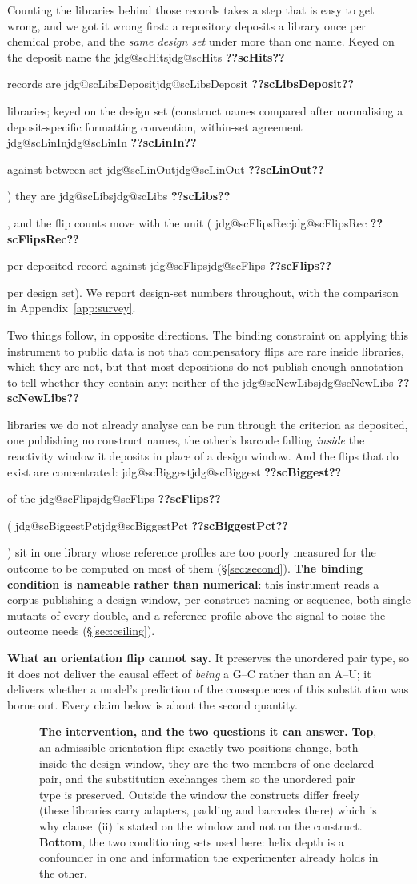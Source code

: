 \documentclass[11pt]{article}
\makeatletter
\newcommand{\jdg}[1]{%
  \ifcsname jdg@#1\endcsname\csname jdg@#1\endcsname
  \else\textbf{??#1??}\PackageError{nm}{undefined measured quantity #1}{}\fi}
\makeatother
\begin{document}
Counting the libraries behind those records takes a step that is easy to get wrong, and we got it
wrong first: a repository deposits a library once per chemical probe, and the \emph{same design
set} under more than one name. Keyed on the deposit name the \jdg{scHits} records
are \jdg{scLibsDeposit} libraries; keyed on the design set (construct names compared after
normalising a deposit-specific formatting convention, within-set agreement \jdg{scLinIn} against
between-set \jdg{scLinOut}) they are \jdg{scLibs}, and the flip counts move with the unit (\jdg{scFlipsRec} per deposited record against \jdg{scFlips} per design
set). We report design-set numbers throughout, with the comparison in Appendix~\ref{app:survey}.

Two things follow, in opposite directions. The binding constraint on applying this instrument to
public data is not that compensatory flips are rare inside libraries, which they are not, but that
most depositions do not publish enough annotation to tell whether they contain any: neither of the
\jdg{scNewLibs} libraries we do not already analyse can be run through the criterion as deposited,
one publishing no construct names, the other's barcode falling \emph{inside} the reactivity window
it deposits in place of a design window. And the flips that do exist are concentrated: \jdg{scBiggest} of the \jdg{scFlips}
(\jdg{scBiggestPct}) sit in one library whose reference profiles are too poorly measured for the
outcome to be computed on most of them (\S\ref{sec:second}). \textbf{The binding condition is
nameable rather than numerical}: this instrument reads a corpus publishing a design window,
per-construct naming or sequence, both single mutants of every double, and a reference profile
above the signal-to-noise the outcome needs (\S\ref{sec:ceiling}).

\begin{scopebox}
\textbf{What an orientation flip cannot say.} It preserves the unordered pair type, so it does not
deliver the causal effect of \emph{being} a G--C rather than an A--U; it delivers whether a model's
prediction of the consequences of this substitution was borne out. Every claim below is about the
second quantity.
\end{scopebox}

\begin{figure}[t]
\centering

\caption{\textbf{The intervention, and the two questions it can answer.} \textbf{Top}, an
admissible orientation flip: exactly two positions change, both inside the design window, they are
the two members of one declared pair, and the substitution exchanges them so the unordered pair
type is preserved. Outside the window the constructs differ freely (these libraries carry
adapters, padding and barcodes there) which is why clause~(ii) is stated on the window and not
on the construct. \textbf{Bottom}, the two conditioning sets used here: helix depth is a
confounder in one and information the experimenter already holds in the other.}
\label{fig:flip}
\end{figure}
\end{document}
